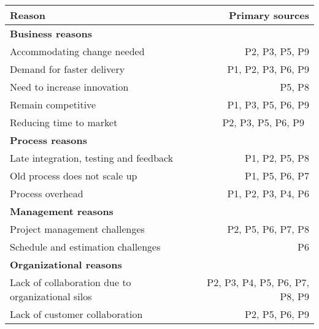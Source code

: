  \label{initreasontable}
\begin{center}
\begin{tabular}{l r }
    \bfseries{Reason} & \bfseries{Primary sources} \\
    \hline
    \bfseries{Business reasons} \\
    Accommodating change needed & P2, P3, P5, P9 \\
    Demand for faster delivery & P1, P2, P3, P6, P9 \\
    Need to increase innovation & P5, P8 \\
    Remain competitive & P1, P3, P5, P6, P9 \\
    Reducing time to market & P2, P3, P5, P6, P9 \\
    \hline
    \bfseries{Process reasons} \\
    Late integration, testing and feedback & P1, P2, P5, P8 \\
    Old process does not scale up & P1, P5, P6, P7 \\
    Process overhead & P1, P2, P3, P4, P6 \\
    \hline
    \bfseries{Management reasons} \\
    Project management challenges & P2, P5, P6, P7, P8 \\
    Schedule and estimation challenges & P6 \\
    \hline
    \bfseries{Organizational reasons} \\
    Lack of collaboration due to organizational silos & P2, P3, P4, P5, P6, P7, P8, P9 \\
    Lack of customer collaboration & P2, P5, P6, P9 \\

\end{tabular}
\end{center}
